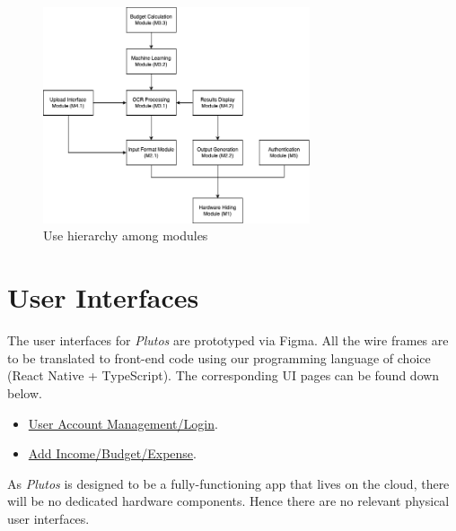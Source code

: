 \documentclass[12pt, titlepage]{article}
\begin{document}

\begin{figure}[H]
\centering
\includegraphics[width=0.7\textwidth]{UsesHierarchy.png}
\caption{Use hierarchy among modules}
\label{FigUH}
\end{figure}


\newpage

\section{User Interfaces}

The user interfaces for \textit{Plutos} are prototyped via Figma. All the wire frames are to be translated to front-end code using our programming language of choice (React Native + TypeScript).
The corresponding UI pages can be found down below.
 
\begin{itemize}
	\item \href{https://www.figma.com/design/W2B31TC8L3tgjZm8189vqm/Plutos?node-id=29-45&t=gfR0b4FgWOY40Jt2-1}{User Account Management/Login}.
	\item \href{https://www.figma.com/design/W2B31TC8L3tgjZm8189vqm/Plutos?node-id=112-2933&t=ZbbX5sZyfK6XT3DZ-1}{Add Income/Budget/Expense}.
\end{itemize}

\noindent As \textit{Plutos} is designed to be a fully-functioning app that lives on the cloud, there will be no dedicated hardware components. Hence there are no relevant physical user interfaces.
\end{document}
